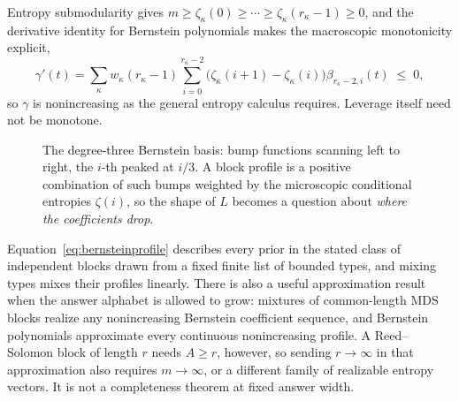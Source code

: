 \documentclass[11pt]{article}
\newif\ifdraftdata
\newcommand{\dataplot}[4]{%
  \ifdraftdata\else\addplot[#1] table[x=#2, y=#3] {#4};\fi}
\newcommand{\datalegend}[1]{\ifdraftdata\else\legend{#1}\fi}
\begin{document}
Entropy submodularity gives
$m \ge \zeta_\kappa(0) \ge \cdots \ge \zeta_\kappa(r_\kappa-1)\ge0$,
and the derivative identity for Bernstein polynomials makes the
macroscopic monotonicity explicit,
%
\begin{equation}
  \gamma'(t)
  = \sum_\kappa w_\kappa(r_\kappa-1)\sum_{i=0}^{r_\kappa-2}
  \big(\zeta_\kappa(i+1)-\zeta_\kappa(i)\big)\beta_{r_\kappa-2,i}(t)
  \;\le\; 0 ,
  \label{eq:bernsteinderiv}
\end{equation}
%
so $\gamma$ is nonincreasing as the general entropy calculus requires.
Leverage itself need not be monotone.

\begin{figure}[H]
\centering
{}
\caption{The degree-three Bernstein basis: bump functions scanning
left to right, the $i$-th peaked at $i/3$. A block profile is a
positive combination of such bumps weighted by the microscopic
conditional entropies $\zeta(i)$, so the shape of $L$ becomes a
question about \emph{where the coefficients drop}.}
\label{fig:bernstein}
\end{figure}

Equation~\eqref{eq:bernsteinprofile} describes every prior in the
stated class of independent blocks drawn from a fixed finite list of
bounded types, and mixing types mixes their profiles linearly. There
is also a useful approximation result when the answer alphabet is
allowed to grow: mixtures of common-length MDS blocks realize any
nonincreasing Bernstein coefficient sequence, and Bernstein
polynomials approximate every continuous nonincreasing profile. A
Reed--Solomon block of length $r$ needs $A \ge r$, however, so
sending $r\to\infty$ in that approximation also requires
$m\to\infty$, or a different family of realizable entropy vectors.
It is not a completeness theorem at fixed answer width.
\end{document}
